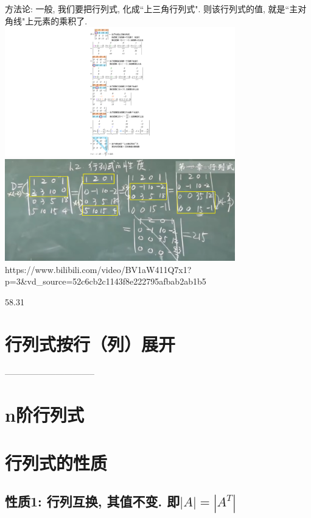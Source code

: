 \documentclass[UTF8]{ctexart}
\begin{document}
	方法论: 一般, 我们要把行列式, 化成``上三角行列式". 则该行列式的值, 就是``主对角线"上元素的乘积了. \\
	
	\includegraphics[width=0.75\textwidth]{img/0010.pdf}\\
	
	\includegraphics[width=0.75\textwidth]{img/0011.png}\\
	
	
	
	https://www.bilibili.com/video/BV1aW411Q7x1?p=3&vd_source=52c6cb2c1143f8e222795afbab2ab1b5
	
	58.31
	
	
	
	\section{行列式按行（列）展开}
	
	
	
	
	--------------------------------
	
	\section{n阶行列式}
	
	
	\section{行列式的性质}
	
	\subsection{性质1: 行列互换, 其值不变. 即$|A|=\left| A^T \right|$}
	
\end{document}
